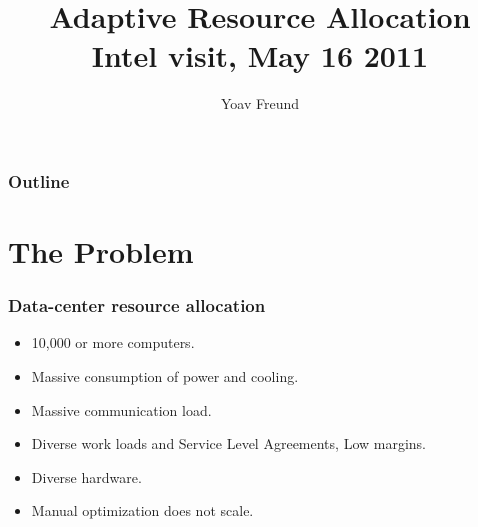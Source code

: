 \documentclass{beamer}
\title%
{Adaptive Resource Allocation\\ Intel visit, May 16 2011}
\author[Freund] %
{Yoav Freund}
\begin{document}
\begin{frame}
  \titlepage
\end{frame}

\begin{frame}
  \frametitle{Outline}
  \tableofcontents
\end{frame}

\section{The Problem}
\begin{frame}
\frametitle{Data-center resource allocation}
\begin{itemize}
\item 10,000 or more computers.
\item Massive consumption of power and cooling.
\item Massive communication load.
\item Diverse work loads and Service Level Agreements, Low margins.
\item Diverse hardware.
\item Manual optimization does not scale.
\end{itemize}
\end{frame}
\end{document}
